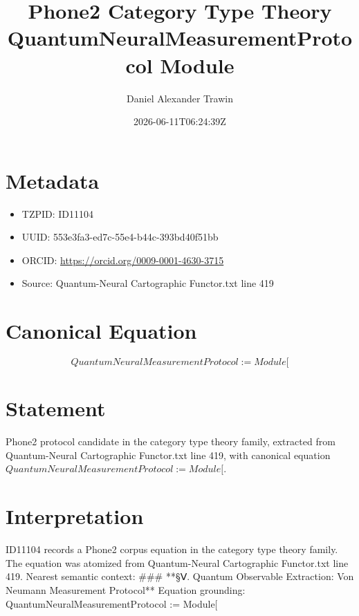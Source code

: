 \documentclass[11pt]{article}
\title{Phone2 Category Type Theory QuantumNeuralMeasurementProtocol Module}
\author{Daniel Alexander Trawin}
\date{2026-06-11T06:24:39Z}
\begin{document}
\maketitle
\section*{Metadata}
\begin{itemize}
\item TZPID: ID11104
\item UUID: 553e3fa3-ed7c-55e4-b44c-393bd40f51bb
\item ORCID: \url{https://orcid.org/0009-0001-4630-3715}
\item Source: Quantum-Neural Cartographic Functor.txt line 419
\end{itemize}
\section*{Canonical Equation}
\[
QuantumNeuralMeasurementProtocol := Module[
\]
\section*{Statement}
Phone2 protocol candidate in the category type theory family, extracted from Quantum-Neural Cartographic Functor.txt line 419, with canonical equation $QuantumNeuralMeasurementProtocol := Module[$.
\section*{Interpretation}
ID11104 records a Phone2 corpus equation in the category type theory family. The equation was atomized from Quantum-Neural Cartographic Functor.txt line 419. Nearest semantic context: ### **§Ⅴ. Quantum Observable Extraction: Von Neumann Measurement Protocol** Equation grounding: QuantumNeuralMeasurementProtocol := Module[
\end{document}
